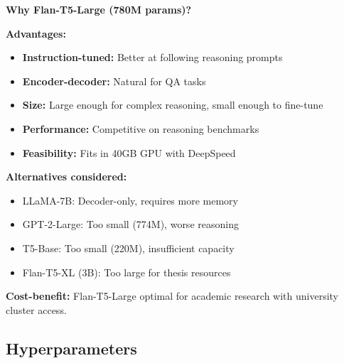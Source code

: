 \documentclass[12pt,a4paper]{article}
\theoremstyle{definition}
\begin{document}
\begin{whybox}
\textbf{Why Flan-T5-Large (780M params)?}

\textbf{Advantages:}
\begin{itemize}
    \item \textbf{Instruction-tuned:} Better at following reasoning prompts
    \item \textbf{Encoder-decoder:} Natural for QA tasks
    \item \textbf{Size:} Large enough for complex reasoning, small enough to fine-tune
    \item \textbf{Performance:} Competitive on reasoning benchmarks
    \item \textbf{Feasibility:} Fits in 40GB GPU with DeepSpeed
\end{itemize}

\textbf{Alternatives considered:}
\begin{itemize}
    \item LLaMA-7B: Decoder-only, requires more memory
    \item GPT-2-Large: Too small (774M), worse reasoning
    \item T5-Base: Too small (220M), insufficient capacity
    \item Flan-T5-XL (3B): Too large for thesis resources
\end{itemize}

\textbf{Cost-benefit:} Flan-T5-Large optimal for academic research with university cluster access.
\end{whybox}

\subsection{Hyperparameters}
\end{document}
